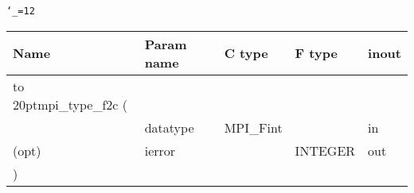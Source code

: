 \begingroup\tt\catcode`\_=12
\begin{tabular}{lllll}
\toprule
\textrm{Name}&\textrm{Param name}&\textrm{C type}&\textrm{F type}&\textrm{inout}\\
\midrule
\hbox to 20pt{mpi_type_f2c (\hss} \\
&datatype&MPI_Fint&&in\\
(opt)&ierror&&INTEGER&out\\
)\\
\bottomrule
\end{tabular}
\endgroup

